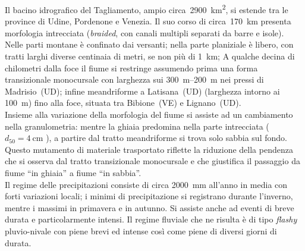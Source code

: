 Il bacino idrografico del Tagliamento, ampio circa~\SI{2900}{\kilo\m\tothe{2}}, si estende tra le province di Udine, Pordenone e Venezia.
Il suo corso di circa~\SI{170}{\kilo\m} presenta morfologia intrecciata (\emph{braided}, con canali multipli separati da barre e isole).
Nelle parti montane è confinato dai versanti; nella parte planiziale è libero, con tratti larghi diverse centinaia di metri, se non più di \SI{1}{\kilo\m};
A qualche decina di chilometri dalla foce il fiume si restringe assumendo prima una forma transizionale monocursale con larghezza sui \SIrange[range-phrase={-}]{300}{200}{\m} nei pressi di Madrisio~(UD);
infine meandriforme a Latisana~(UD) (larghezza intorno ai \SI{100}{\m}) fino alla foce, situata tra Bibione~(VE) e Lignano~(UD).
\\
Insieme alla variazione della morfologia del fiume si assiste ad un cambiamento nella granulometria: mentre la ghiaia predomina nella parte intrecciata ($d_{50} = \SI{4}{\centi\m}$ ), a partire dal tratto meandriforme si trova solo sabbia sul fondo.
Questo mutamento di materiale trasportato riflette la riduzione della pendenza che si osserva dal tratto transizionale monocursale e che giustifica il passaggio da fiume “in ghiaia” a fiume “in sabbia”.
\\
Il regime delle precipitazioni consiste di circa \SI{2000}{\mm} all'anno in media con forti variazioni locali; i minimi di precipitazione si registrano durante l'inverno, mentre i massimi in primavera e in autunno. Si assiste anche ad eventi di breve durata e particolarmente intensi.
Il regime fluviale che ne risulta è di tipo \emph{flashy} pluvio-nivale con piene brevi ed intense così come piene di diversi giorni di durata.


